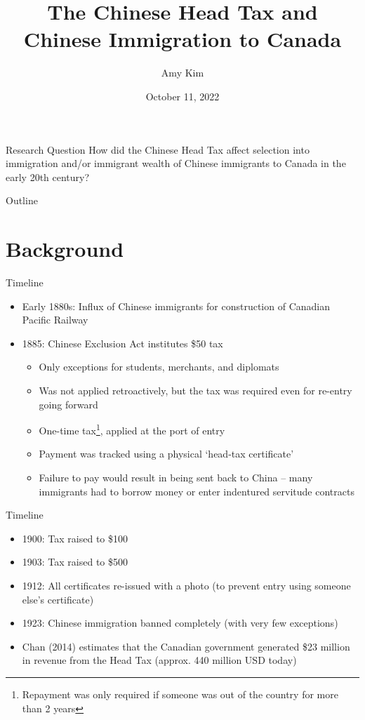 \documentclass[pdf]{beamer}
\title{The Chinese Head Tax and Chinese Immigration to Canada}
\author{Amy Kim}
\date{October 11, 2022}
\begin{document}
\begin{frame}
    \titlepage
\end{frame}

\begin{frame}{Research Question}
    How did the Chinese Head Tax affect selection into immigration and/or immigrant wealth of Chinese immigrants to Canada in the early 20th century?    
\end{frame}

\begin{frame}{Outline}
    \tableofcontents
\end{frame}


\section{Background}
\begin{frame}{Timeline}
    \begin{itemize}
        \item Early 1880s: Influx of Chinese immigrants for construction of Canadian Pacific Railway
        \item 1885: Chinese Exclusion Act institutes \$50 tax
        \begin{itemize}
            \item Only exceptions for students, merchants, and diplomats
            \item Was not applied retroactively, but the tax was required even for re-entry going forward
            \item One-time tax\footnote{Repayment was only required if someone was out of the country for more than 2 years}, applied at the port of entry
            \item Payment was tracked using a physical `head-tax certificate'
            \item Failure to pay would result in being sent back to China -- many immigrants had to borrow money or enter indentured servitude contracts
        \end{itemize}
    \end{itemize}
\end{frame}

\begin{frame}{Timeline}
    \begin{itemize}
        \item 1900: Tax raised to \$100 
        \item 1903: Tax raised to \$500 
        \item 1912: All certificates re-issued with a photo (to prevent entry using someone else's certificate)
        \item 1923: Chinese immigration banned completely (with very few exceptions)
        \item Chan (2014) estimates that the Canadian government generated \$23 million in revenue from the Head Tax (approx. 440 million USD today)
    \end{itemize}
\end{frame}
\end{document}
